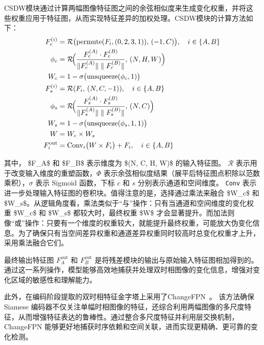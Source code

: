 CSDW模块通过计算两幅图像特征图之间的余弦相似度来生成变化权重，并将这些权重应用于特征图，从而实现特征差异的加权处理。CSDW模块的计算方法如下：
\begin{align}
F_c^{(i)} &= \mathcal{R}\bigl(\mathrm{permute}(F_i,(0,2,3,1)),\,(-1,C)\bigr), \quad i\in\{A,B\} \label{eq:lenet-1}\\
\phi_c &= \mathcal{R}\!\Bigl(\frac{F_c^{(A)}\cdot F_c^{(B)}}{\|F_c^{(A)}\|\;\|\;F_c^{(B)}\|},\,(N,H,W)\Bigr) \label{eq:lenet-2}\\
W_c &= 1 - \sigma\bigl(\mathrm{unsqueeze}(\phi_c,1)\bigr) \label{eq:lenet-3}\\
F_s^{(i)} &= \mathcal{R}(F_i,\,(N,C,-1)), \quad i\in\{A,B\} \label{eq:lenet-4}\\
\phi_s &= \mathcal{R}\!\Bigl(\frac{F_s^{(A)}\cdot F_s^{(B)}}{\|F_s^{(A)}\|\;\|\;F_s^{(B)}\|},\,(N,C)\Bigr) \label{eq:lenet-5}\\
W_s &= 1 - \sigma\bigl(\mathrm{unsqueeze}(\phi_s,1,1)\bigr) \label{eq:lenet-6}\\
W &= W_c \times W_s \label{eq:lenet-7}\\
F_i^{\mathrm{out}} &= \mathrm{Conv}_i\bigl(W \times F_i\bigr) + F_i,\quad i\in\{A,B\} \label{eq:lenet-8}
\end{align}

其中， \$F\_{A}\$ 和 \$F\_{B}\$ 表示维度为 \$(N, C, H, W)\$ 的输入特征图。
\(\mathcal{R}\) 表示用于改变输入维度的重塑函数，\(\Phi\) 表示余弦相似度结果（展平后特征图点积除以范数乘积），\(\sigma\) 表示 Sigmoid 函数，下标 \(c\) 和 \(s\) 分别表示通道和空间维度。
\texttt{Conv} 表示进一步处理输入特征图的卷积块。值得注意的是，选择通过乘法来融合 \$W\_{c}\$ 和 \$W\_{s}\$。从逻辑角度看，乘法类似于“与”操作：只有当通道和空间维度的变化权重 \$W\_{c}\$ 和 \$W\_{s}\$ 都较大时，最终权重 \$W\$ 才会显著提升。而加法则像“或”操作：只要有一个维度的权重较大，就能提升最终权重，可能放大伪变化信息。为了确保只有当空间差异权重和通道差异权重同时较高时总变化权重才上升，采用乘法融合它们。

最终输出特征图 \(F_{A}^{\mathrm{out}}\) 和 \(F_{B}^{\mathrm{out}}\) 是将残差模块的输出与原始输入特征图相加得到的。通过这一系列操作，模型能够高效地捕获并处理双时相图像的变化信息，增强对变化区域的敏感性和理解能力。

此外，在编码阶段提取的双时相特征金字塔上采用了ChangeFPN~\cite{dong_efficientcd_2024}。 该方法确保 Siamese 编码器不仅关注单幅时相图像的特征，还综合利用两幅图像的多尺度特征，从而增强特征表达的鲁棒性。通过整合多尺度特征并利用层交换机制，ChangeFPN 能够更好地捕获时序依赖和空间关联，进而实现更精确、更可靠的变化检测。

